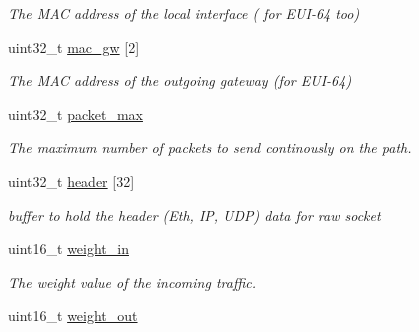 \begin{DoxyCompactItemize}
\begin{DoxyCompactList}\small\item\em The M\-A\-C address of the local interface ( for E\-U\-I-\/64 too) \end{DoxyCompactList}\item 
\hypertarget{structpath__struct_ad4f0581e22484ba5ba1529ee734a3bb4}{uint32\-\_\-t \hyperlink{structpath__struct_ad4f0581e22484ba5ba1529ee734a3bb4}{mac\-\_\-gw} \mbox{[}2\mbox{]}}\label{structpath__struct_ad4f0581e22484ba5ba1529ee734a3bb4}

\begin{DoxyCompactList}\small\item\em The M\-A\-C address of the outgoing gateway (for E\-U\-I-\/64) \end{DoxyCompactList}\item 
\hypertarget{structpath__struct_ab89e1764cb300a884e78fad537bba540}{uint32\-\_\-t \hyperlink{structpath__struct_ab89e1764cb300a884e78fad537bba540}{packet\-\_\-max}}\label{structpath__struct_ab89e1764cb300a884e78fad537bba540}

\begin{DoxyCompactList}\small\item\em The maximum number of packets to send continously on the path. \end{DoxyCompactList}\item 
\hypertarget{structpath__struct_a45f2554d67936d979dfb493cf22eae05}{uint32\-\_\-t \hyperlink{structpath__struct_a45f2554d67936d979dfb493cf22eae05}{header} \mbox{[}32\mbox{]}}\label{structpath__struct_a45f2554d67936d979dfb493cf22eae05}

\begin{DoxyCompactList}\small\item\em buffer to hold the header (Eth, I\-P, U\-D\-P) data for raw socket \end{DoxyCompactList}\item 
\hypertarget{structpath__struct_adca829bd3e5d76e49fdaaf9b266b4d30}{uint16\-\_\-t \hyperlink{structpath__struct_adca829bd3e5d76e49fdaaf9b266b4d30}{weight\-\_\-in}}\label{structpath__struct_adca829bd3e5d76e49fdaaf9b266b4d30}

\begin{DoxyCompactList}\small\item\em The weight value of the incoming traffic. \end{DoxyCompactList}\item 
\hypertarget{structpath__struct_a577d5796ad6c85d3399be9c28356d67d}{uint16\-\_\-t \hyperlink{structpath__struct_a577d5796ad6c85d3399be9c28356d67d}{weight\-\_\-out}}\label{structpath__struct_a577d5796ad6c85d3399be9c28356d67d}


\end{DoxyCompactItemize}
